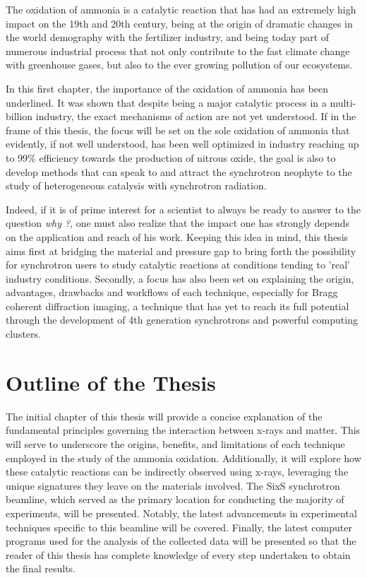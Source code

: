 The oxidation of ammonia is a catalytic reaction that has had an extremely high impact on the 19th and 20th century, being at the origin of dramatic changes in the world demography with the fertilizer industry, and being today part of numerous industrial process that not only contribute to the fast climate change with greenhouse gases, but also to the ever growing pollution of our ecosystems.

In this first chapter, the importance of the oxidation of ammonia has been underlined.
It was shown that despite being a major catalytic process in a multi-billion industry, the exact mechanisms of action are not yet understood.
If in the frame of this thesis, the focus will be set on the sole oxidation of ammonia that evidently, if not well understood, has been well optimized in industry reaching up to 99\% efficiency towards the production of nitrous oxide, the goal is also to develop methods that can speak to and attract the synchrotron neophyte to the study of heterogeneous catalysis with synchrotron radiation.

Indeed, if it is of prime interest for a scientist to always be ready to answer to the question \textit{why ?}, one must also realize that the impact one has strongly depends on the application and reach of his work.
Keeping this idea in mind, this thesis aims first at bridging the material and pressure gap to bring forth the possibility for synchrotron users to study catalytic reactions at conditions tending to 'real' industry conditions.
Secondly, a focus has also been set on explaining the origin, advantages, drawbacks and workflows of each technique, especially for Bragg coherent diffraction imaging, a technique that has yet to reach its full potential through the development of 4th generation synchrotrons and powerful computing clusters.

\section{Outline of the Thesis}

The initial chapter of this thesis will provide a concise explanation of the fundamental principles governing the interaction between x-rays and matter.
This will serve to underscore the origins, benefits, and limitations of each technique employed in the study of the ammonia oxidation.
Additionally, it will explore how these catalytic reactions can be indirectly observed using x-rays, leveraging the unique signatures they leave on the materials involved.
The SixS synchrotron beamline, which served as the primary location for conducting the majority of experiments, will be presented.
Notably, the latest advancements in experimental techniques specific to this beamline will be covered.
Finally, the latest computer programs used for the analysis of the collected data will be presented so that the reader of this thesis has complete knowledge of every step undertaken to obtain the final results.

